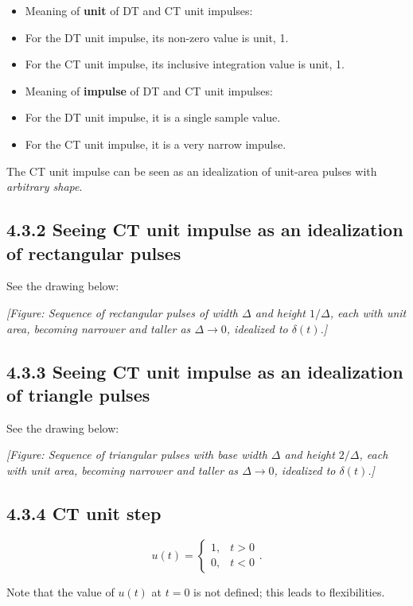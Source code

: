 \documentclass[11pt]{article}
\begin{document}
\begin{itemize}
  \item Meaning of \textbf{unit} of DT and CT unit impulses:
  \item For the DT unit impulse, its non-zero value is unit, 1.
  \item For the CT unit impulse, its inclusive integration value is unit, 1.
  \item Meaning of \textbf{impulse} of DT and CT unit impulses:
  \item For the DT unit impulse, it is a single sample value.
  \item For the CT unit impulse, it is a very narrow impulse.
\end{itemize}

The CT unit impulse can be seen as an idealization of unit-area pulses with \textit{arbitrary shape}.

\subsection*{4.3.2 Seeing CT unit impulse as an idealization of rectangular pulses}

See the drawing below:

\textit{[Figure: Sequence of rectangular pulses of width $\Delta$ and height $1/\Delta$, each with unit area, becoming narrower and taller as $\Delta \to 0$, idealized to $\delta(t)$.]}

\subsection*{4.3.3 Seeing CT unit impulse as an idealization of triangle pulses}

See the drawing below:

\textit{[Figure: Sequence of triangular pulses with base width $\Delta$ and height $2/\Delta$, each with unit area, becoming narrower and taller as $\Delta \to 0$, idealized to $\delta(t)$.]}

\subsection*{4.3.4 CT unit step}

\[u(t) = \begin{cases} 1, & t > 0 \\ 0, & t < 0 \end{cases}.\]

Note that the value of $u(t)$ at $t = 0$ is not defined; this leads to flexibilities.
\end{document}

